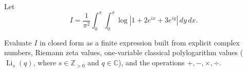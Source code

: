 Let \[
I=
\frac{1}{\pi^2}
\int_0^\pi\int_0^\pi
\log \left|1+2e^{ix}+3e^{iy}\right|\,dy\,dx .
\]

Evaluate \(I\) in closed form as a finite expression built from explicit complex numbers, Riemann zeta values, one-variable classical polylogarithm values (\(\operatorname{Li}_s(q)\), where \(s\in\mathbb Z_{>0}\) and \(q\in\mathbb C\)), and the operations \(+,-,\times,\div\).
